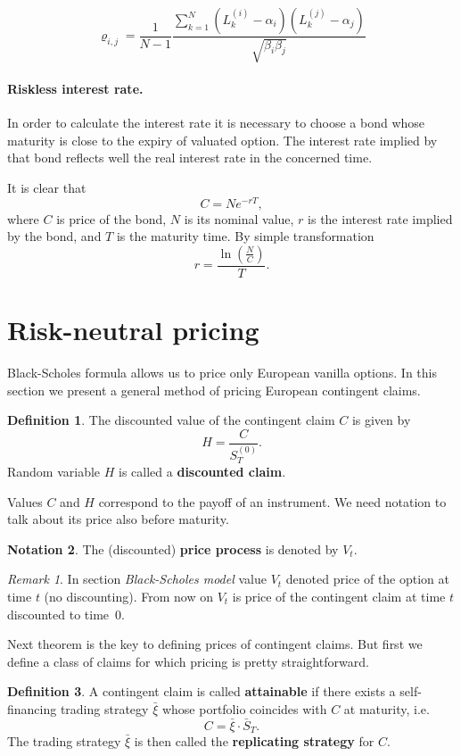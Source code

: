 \documentclass[a4paper,12pt, oneside]{book}
\theoremstyle{definition}
\newtheorem{mydef}{Definition}[chapter]
\newtheorem{notation}[mydef]{Notation}
\theoremstyle{remark}
\newtheorem{remark}{Remark}[chapter]
\def\Sa{\bar{S}}
\def\xia{\bar{\xi}}
\begin{document}
\[ \varrho_{i,j} = \frac{1}{N-1} \frac{\sum\limits_{k=1}^N(L^{(i)}_k - \alpha_i)(L^{(j)}_k - \alpha_j)}{\sqrt{\beta_i \beta_j}} \]

\paragraph{Riskless interest rate.}
In order to calculate the interest rate it is necessary to choose a bond whose maturity is close to the expiry of valuated option. The interest rate implied by that bond reflects well the real interest rate in the concerned time.

It is clear that
\[ C = Ne^{-rT}, \]
where $C$ is price of the bond, $N$ is its nominal value, $r$ is the interest rate implied by the bond, and $T$ is the maturity time. By simple transformation
\begin{equation*}
r = \dfrac{\ln(\frac{N}{C})}{T}.
\end{equation*}

\section{Risk-neutral pricing}
\label{sec:risk-neutral}
Black-Scholes formula allows us to price only European vanilla options. In this section we present a general method of pricing European contingent claims. 
\begin{mydef}
 The discounted value of the contingent claim $C$ is given by
 \begin{equation*}
  H = \frac{C}{S^{(0)}_T}.
 \end{equation*}
 Random variable $H$ is called a \textbf{discounted claim}.
\end{mydef}

Values $C$ and $H$ correspond to the payoff of an instrument. We need notation to talk about its price also before maturity.
\begin{notation}
 The (discounted) \textbf{price process} is denoted by $V_t$. 
\end{notation}
\begin{remark}
 In section \textit{Black-Scholes model} value $V_t$ denoted price of the option at time $t$ (no discounting). From now on $V_t$ is price of the contingent claim at time $t$ discounted to time~$0$.
\end{remark}

Next theorem is the key to defining prices of contingent claims. But first we define a class of claims for which pricing is pretty straightforward. 
\begin{mydef}
 A contingent claim is called \textbf{attainable} if there exists a self-financing trading strategy $\xia$ whose portfolio coincides with $C$ at maturity, i.e.
 \[ C = \xia \cdot \Sa_T. \]
 The trading strategy $\xia$ is then called the \textbf{replicating strategy} for $C$.
\end{mydef}
\end{document}
